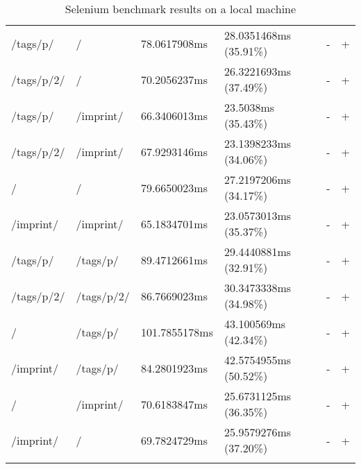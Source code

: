 \begin{center}
\begin{longtable}{llllll}
	\hline
	/tags/p/ & / & 78.0617908ms & 28.0351468ms (35.91\%) & - & + \\
	/tags/p/2/ & / & 70.2056237ms & 26.3221693ms (37.49\%) & - & + \\
	/tags/p/ & /imprint/ & 66.3406013ms & 23.5038ms (35.43\%) & - & + \\
	/tags/p/2/ & /imprint/ & 67.9293146ms & 23.1398233ms (34.06\%) & - & + \\
	\hline
	/ & / & 79.6650023ms & 27.2197206ms (34.17\%) & - & + \\
	/imprint/ & /imprint/ & 65.1834701ms & 23.0573013ms (35.37\%) & - & + \\
	/tags/p/ & /tags/p/ & 89.4712661ms & 29.4440881ms (32.91\%) & - & + \\
	/tags/p/2/ & /tags/p/2/ & 86.7669023ms & 30.3473338ms (34.98\%) & - & + \\
	\hline
	/ & /tags/p/ & 101.7855178ms & 43.100569ms (42.34\%) & - & + \\
	/imprint/ & /tags/p/ & 84.2801923ms & 42.5754955ms (50.52\%) & - & + \\
	\hline
	/ & /imprint/ & 70.6183847ms & 25.6731125ms (36.35\%) & - & + \\
	/imprint/ & / & 69.7824729ms & 25.9579276ms (37.20\%) & - & + \\
	\hline
\caption{Selenium benchmark results on a local machine}
\label{tab:selenium_benchmark_results_local}
\end{longtable}
\end{center}

\newpage{}

